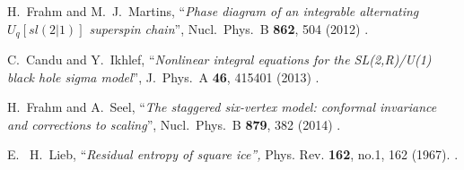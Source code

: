 \documentclass[12pt]{article}
\begin{document}
\begin{thebibliography}{99}
  H.~Frahm and M.~J.~Martins,
``\emph{Phase diagram of an integrable alternating $U_q[sl(2|1)]$ superspin chain}'', Nucl.\ Phys.\ B {\bf 862}, 504 (2012) \href{https://arxiv.org/abs/1202.4676}{{\ttfamily [arXiv:1202.4676]}}.


  C.~Candu and Y.~Ikhlef,
 ``\emph{Nonlinear integral equations for the SL(2,R)/U(1) black hole sigma model}'',
 J.\ Phys.\ A {\bf 46}, 415401 (2013) \href{https://arxiv.org/abs/1306.2646}{{\ttfamily [arXiv:1306.2646]}}.



  H.~Frahm and A.~Seel,
  ``\emph{The staggered six-vertex model: conformal invariance and corrections to scaling}'',
  Nucl.\ Phys.\ B {\bf 879}, 382 (2014) \href{https://arxiv.org/abs/1311.6911}{{\ttfamily [arXiv:1311.6911]}}.

E.~ H.~Lieb, ``\emph{Residual entropy of square ice'',}
Phys. Rev. {\bf 162}, no.1, 162 (1967).
 \href{https://journals.aps.org/pr/abstract/10.1103/PhysRev.162.162}{{}}.

    
\end{thebibliography}
\end{document}
